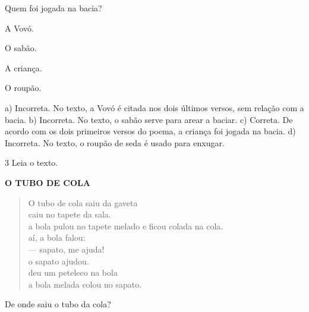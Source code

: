 
Quem foi jogada na bacia?

\begin{minipage}{.5\textwidth}
\begin{escolha}
	\item A Vovó.

	\item O sabão.

	\item A criança.

	\item O roupão.
\end{escolha}
\end{minipage}

a) Incorreta. No texto, a Vovó é citada nos dois últimos versos,
sem relação com a bacia. 
b) Incorreta. No texto, o sabão serve para arear a baciar.
c) Correta. De acordo com os dois primeiros versos do poema, a criança
foi jogada na bacia.
d) Incorreta. No texto, o roupão de seda é usado para enxugar.  

\num{3} Leia o texto.

\textbf{O TUBO DE COLA}

\begin{verse}
O tubo de cola saiu da gaveta\\
caiu no tapete da sala.\\
a bola pulou no tapete melado e ficou colada na cola.\\
aí, a bola falou:\\
--- sapato, me ajuda!\\
o sapato ajudou.\\
deu um peteleco na bola\\
a bola melada colou no sapato.
\end{verse}



De onde saiu o tubo da cola?

